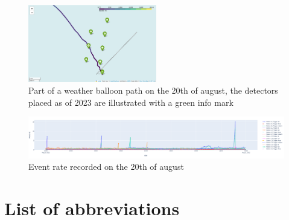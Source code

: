 \documentclass[11pt,a4paper,faculty=we,language=en,doctype=report]{cls/ugent-doc}
\begin{document}
\begin{figure}
  \centering
  \includegraphics[width=0.5\textwidth]{InteractingWeatherBalloonPath.png}
  \caption{Part of a weather balloon path on the 20th of august, the detectors placed as of 2023 are illustrated with
  a green info mark}
  \label{fig:IntWB}
\end{figure}

\begin{figure}[h!]
  \centering
  \includegraphics[width=\textwidth]{Events20Aug.png}
  \caption{Event rate recorded on the 20th of august}
  \label{fig:20thEvents}
\end{figure}


\appendix
\chapter{List of abbreviations}
\end{document}
